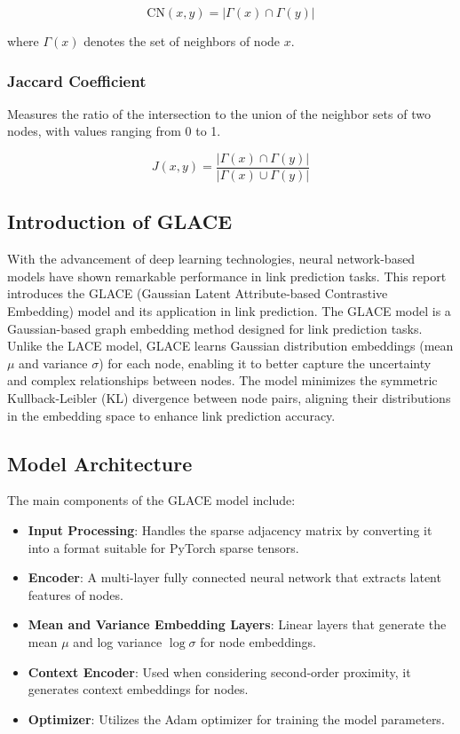 \documentclass[11pt]{article}
\begin{document}
\[
\text{CN}(x, y) = |\Gamma(x) \cap \Gamma(y)|
\]

where \( \Gamma(x) \) denotes the set of neighbors of node \( x \).

\subsubsection{Jaccard Coefficient}
Measures the ratio of the intersection to the union of the neighbor sets of two nodes, with values ranging from 0 to 1.

\[
J(x, y) = \frac{|\Gamma(x) \cap \Gamma(y)|}{|\Gamma(x) \cup \Gamma(y)|}
\]

\subsection{Introduction of GLACE}
    With the advancement of deep learning technologies, neural network-based models have shown remarkable performance in link prediction tasks. This report introduces the GLACE (Gaussian Latent Attribute-based Contrastive Embedding) model and its application in link prediction. The GLACE model is a Gaussian-based graph embedding method designed for link prediction tasks. Unlike the LACE model, GLACE learns Gaussian distribution embeddings (mean $\mu$ and variance $\sigma$) for each node, enabling it to better capture the uncertainty and complex relationships between nodes. The model minimizes the symmetric Kullback-Leibler (KL) divergence between node pairs, aligning their distributions in the embedding space to enhance link prediction accuracy.

\subsection{Model Architecture}

The main components of the GLACE model include:

\begin{itemize}
    \item \textbf{Input Processing}: Handles the sparse adjacency matrix by converting it into a format suitable for PyTorch sparse tensors.
    \item \textbf{Encoder}: A multi-layer fully connected neural network that extracts latent features of nodes.
    \item \textbf{Mean and Variance Embedding Layers}: Linear layers that generate the mean $\mu$ and log variance $\log\sigma$ for node embeddings.
    \item \textbf{Context Encoder}: Used when considering second-order proximity, it generates context embeddings for nodes.
    \item \textbf{Optimizer}: Utilizes the Adam optimizer for training the model parameters.
\end{itemize}
\end{document}
